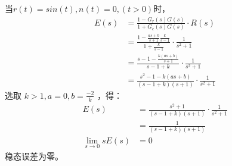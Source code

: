 {{        当$r(t)=sin(t),n(t)=0,(t>0)$时，
		\begin{align*}
		E(s)&=\frac{1-G_r(s)G(s)}{1+G_c(s)G(s)}\cdot R(s)\\
		&=\frac{1-\frac{as+b}{s+1}\frac{k}{s-1}}{1+\frac{k}{s-1}}\cdot\frac{1}{s^2+1}\\
		&=\frac{s-1-\frac{k(as+b)}{s+1}}{s-1+k}\cdot\frac{1}{s^2+1}\\
		&=\frac{s^2-1-k(as+b)}{(s-1+k)(s+1)}\cdot\frac{1}{s^2+1}
		\end{align*}
		选取 $k>1,a=0,b=\frac{-2}{k}$ ，得：
		\begin{align*}
		E(s)&=\frac{s^2+1}{(s-1+k)(s+1)}\cdot\frac{1}{s^2+1}\\
		&=\frac{1}{(s-1+k)(s+1)}\\
		\lim_{s\to 0}sE(s)&=0
		\end{align*}
		稳态误差为零。
	}
}

